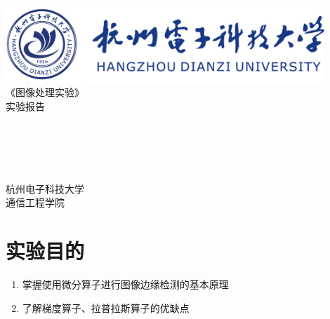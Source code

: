 \documentclass[a4paper]{ctexart}
\begin{document}
  \begin{titlepage}
      \songti
      \begin{center}
        \vspace*{1cm}
        \includegraphics[width=0.9\textwidth]{../HDU.png}\\
        \vspace*{2.5cm}
        {\fontsize{24pt}{0}
          《图像处理实验》\\
          \fontsize{36pt}{0}
          \vspace*{1cm}
          实验报告\\
        }
        \vspace*{3cm}
        {\fontsize{18pt}{0}
           \\
          \vspace*{2cm}
           \\
          \vspace*{0.5cm}
           \\
          \vspace*{0.5cm}
           \\
          \vspace*{0.5cm}
           \\
          \vspace*{5cm}
          杭州电子科技大学\\通信工程学院
        }
      \end{center}
  \end{titlepage}


  \newpage
  \section{实验目的}
  \begin{enumerate}
    \item 掌握使用微分算子进行图像边缘检测的基本原理
    \item 了解梯度算子、拉普拉斯算子的优缺点
  \end{enumerate}
\end{document}
